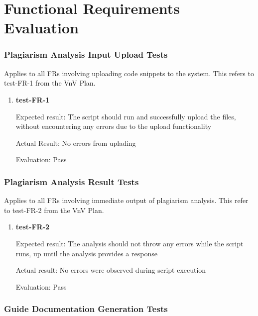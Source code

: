 \documentclass[12pt, titlepage]{article}
\begin{document}
\listoffigures %

\newpage


\section{Functional Requirements Evaluation}
\subsubsection{Plagiarism Analysis Input Upload Tests}

Applies to all FRs involving uploading code snippets to the system. This refers
to test-FR-1 from the VnV Plan.

\begin{enumerate}

\item{\textbf{test-FR-1}}

Expected result: The script should run and successfully upload the files, without 
encountering any errors due to the upload functionality

Actual Result: No errors from uplading

Evaluation: Pass
					

\end{enumerate}

\subsubsection{Plagiarism Analysis Result Tests}

Applies to all FRs involving immediate output of plagiarism analysis. This
refer to test-FR-2 from the VnV Plan.

\begin{enumerate}

\item{\textbf{test-FR-2}}

Expected result: The analysis should not throw any errors while the script runs,
up until the analysis provides a response

Actual result: No errors were observed during script execution

Evaluation: Pass

					

\end{enumerate}

\subsubsection{Guide Documentation Generation Tests}
\end{document}
